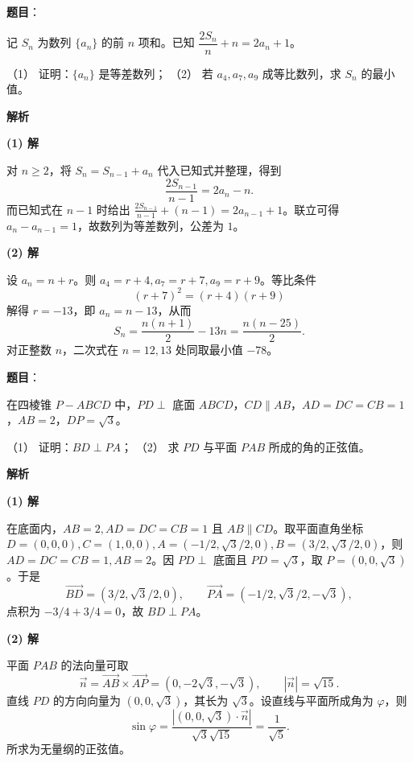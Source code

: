 \begin{answer}

\textbf{题目}：

记 $S_n$ 为数列 $\{a_n\}$ 的前 $n$ 项和。已知 $\dfrac{2S_n}{n}+n=2a_n+1$。

（1） 证明：$\{a_n\}$ 是等差数列；  
（2） 若 $a_4,a_7,a_9$ 成等比数列，求 $S_n$ 的最小值。

\textbf{解析}

\textbf{(1) 解}

对 $n\ge2$，将 $S_n=S_{n-1}+a_n$ 代入已知式并整理，得到
\nopagebreak[4]
\[
\frac{2S_{n-1}}{n-1}=2a_n-n.
\]
而已知式在 $n-1$ 时给出 $\frac{2S_{n-1}}{n-1}+(n-1)=2a_{n-1}+1$。联立可得 $a_n-a_{n-1}=1$，故数列为等差数列，公差为 $1$。

\textbf{(2) 解}

设 $a_n=n+r$。则 $a_4=r+4,a_7=r+7,a_9=r+9$。等比条件
\nopagebreak[4]
\[
(r+7)^2=(r+4)(r+9)
\]
解得 $r=-13$，即 $a_n=n-13$，从而
\nopagebreak[4]
\[
S_n=\frac{n(n+1)}2-13n=\frac{n(n-25)}2.
\]
对正整数 $n$，二次式在 $n=12,13$ 处同取最小值 $-78$。



\end{answer}
\begin{answer}

\textbf{题目}：

在四棱锥 $P-ABCD$ 中，$PD\perp$ 底面 $ABCD$，$CD\parallel AB$，$AD=DC=CB=1$，$AB=2$，$DP=\sqrt3$。

（1） 证明：$BD\perp PA$；  
（2） 求 $PD$ 与平面 $PAB$ 所成的角的正弦值。
\nopagebreak[4]
\begin{center}\end{center}
\nopagebreak[4]
\textbf{解析}

\textbf{(1) 解}

在底面内，$AB=2,AD=DC=CB=1$ 且 $AB\parallel CD$。取平面直角坐标 $D=(0,0,0),C=(1,0,0),A=(-1/2,\sqrt3/2,0),B=(3/2,\sqrt3/2,0)$，则 $AD=DC=CB=1,AB=2$。因 $PD\perp$ 底面且 $PD=\sqrt3$，取 $P=(0,0,\sqrt3)$。于是
\nopagebreak[4]
\[
\overrightarrow{BD}=(3/2,\sqrt3/2,0),\qquad \overrightarrow{PA}=(-1/2,\sqrt3/2,-\sqrt3),
\]
点积为 $-3/4+3/4=0$，故 $BD\perp PA$。

\textbf{(2) 解}

平面 $PAB$ 的法向量可取
\nopagebreak[4]
\[
\vec n=\overrightarrow{AB}\times\overrightarrow{AP}=(0,-2\sqrt3,-\sqrt3),\qquad |\vec n|=\sqrt{15}.
\]
直线 $PD$ 的方向向量为 $(0,0,\sqrt3)$，其长为 $\sqrt3$。设直线与平面所成角为 $\varphi$，则
\nopagebreak[4]
\[
\sin\varphi=\frac{|(0,0,\sqrt3)\cdot\vec n|}{\sqrt3\sqrt{15}}=\frac1{\sqrt5}.
\]
所求为无量纲的正弦值。



\end{answer}
